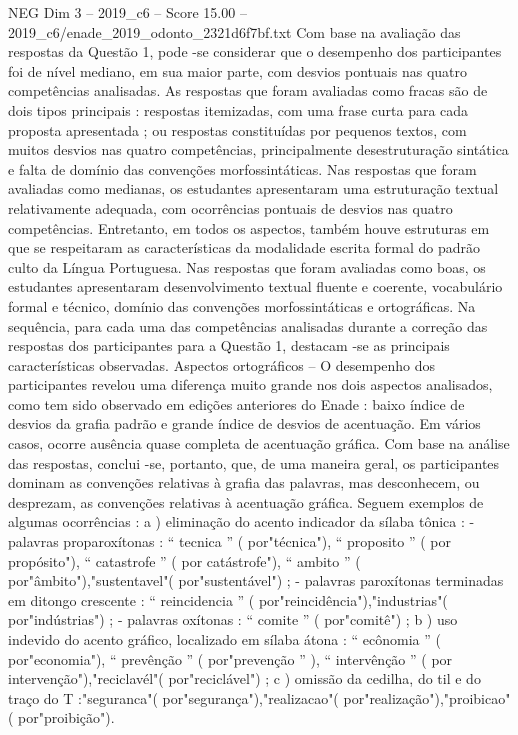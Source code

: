\begin{textsample}{NEG Dim 3 – 2019\_c6 – Score 15.00 – 2019\_c6/enade\_2019\_odonto\_2321d6f7bf.txt}
Com base na avaliação das respostas da Questão 1, pode -se considerar que o desempenho dos participantes foi de nível mediano, em sua maior parte, com desvios pontuais nas quatro competências analisadas.
As respostas que foram avaliadas como fracas são de dois tipos principais : respostas itemizadas, com uma frase curta para cada proposta apresentada ; ou respostas constituídas por pequenos textos, com muitos desvios nas quatro competências, principalmente desestruturação sintática e falta de domínio das convenções morfossintáticas.
Nas respostas que foram avaliadas como medianas, os estudantes apresentaram uma estruturação textual relativamente adequada, com ocorrências pontuais de desvios nas quatro competências.
Entretanto, em todos os aspectos, também houve estruturas em que se respeitaram as características da modalidade escrita formal do padrão culto da Língua Portuguesa.
Nas respostas que foram avaliadas como boas, os estudantes apresentaram desenvolvimento textual fluente e coerente, vocabulário formal e técnico, domínio das convenções morfossintáticas e ortográficas.
Na sequência, para cada uma das competências analisadas durante a correção das respostas dos participantes para a Questão 1, destacam -se as principais características observadas.
Aspectos ortográficos – O desempenho dos participantes revelou uma diferença muito grande nos dois aspectos analisados, como tem sido observado em edições anteriores do Enade : baixo índice de desvios da grafia padrão e grande índice de desvios de acentuação.
Em vários casos, ocorre ausência quase completa de acentuação gráfica.
Com base na análise das respostas, conclui -se, portanto, que, de uma maneira geral, os participantes dominam as convenções relativas à grafia das palavras, mas desconhecem, ou desprezam, as convenções relativas à acentuação gráfica.
Seguem exemplos de algumas ocorrências : a ) eliminação do acento indicador da sílaba tônica : - palavras proparoxítonas : “ tecnica ” ( por"técnica"), “ proposito ” ( por propósito"), “ catastrofe ” ( por catástrofe"), “ ambito ” ( por"âmbito"),"sustentavel"( por"sustentável") ; - palavras paroxítonas terminadas em ditongo crescente : “ reincidencia ” ( por"reincidência"),"industrias"( por"indústrias") ; - palavras oxítonas : “ comite ” ( por"comitê") ; b ) uso indevido do acento gráfico, localizado em sílaba átona : “ ecônomia ” ( por"economia"), “ prevênção ” ( por"prevenção ” ), “ intervênção ” ( por intervenção"),"reciclavél"( por"reciclável") ; c ) omissão da cedilha, do til e do traço do T :"seguranca"( por"segurança"),"realizacao"( por"realização"),"proibicao"( por"proibição").

\end{textsample}
